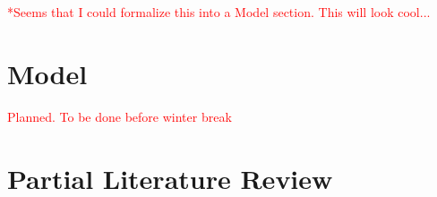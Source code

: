 \documentclass[12pt]{article}
\begin{document}
\textcolor{red}{*Seems that I could formalize this into a Model section. This will look cool...}
\section{Model}
\textcolor{red}{Planned. To be done before winter break}

\medskip
\noindent

\fi


\section{Partial Literature Review} 

\iffalse
\end{document}
